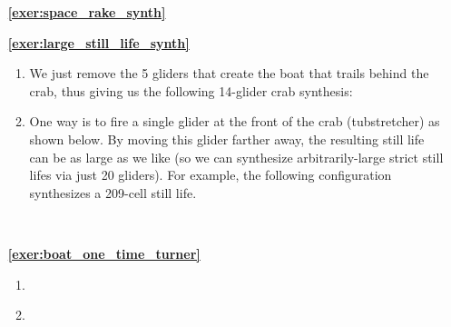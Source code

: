 \begin{multicols}{2}
\begin{itemize}[leftmargin=0em]
\begin{enumerate}[leftmargin=1.5em,label=\bf\color{ocre}(\alph*)]
			\item {} \\
		\end{enumerate}
		
		
		\item[\bf\color{ocre}\sffamily\ref{exer:space_rake_synth}]  \\
		
		
		\item[\bf\color{ocre}\sffamily\ref{exer:large_still_life_synth}]
		\begin{enumerate}[leftmargin=1.5em,label=\bf\color{ocre}(\alph*),series=solu_one_time]
			\item We just remove the 5 gliders that create the boat that trails behind the crab, thus giving us the following 14-glider crab synthesis:
			\begin{center}
			\end{center}
			
			\item One way is to fire a single glider at the front of the crab (tubstretcher) as shown below. By moving this glider farther away, the resulting still life can be as large as we like (so we can synthesize arbitrarily-large strict still lifes via just 20 gliders). For example, the following configuration synthesizes a 209-cell still life.
			\begin{center}
				 \\
			\end{center}
		\end{enumerate}
		
		
		\item[\bf\color{ocre}\sffamily\ref{exer:boat_one_time_turner}]
		\begin{enumerate}[leftmargin=1.5em,label=\bf\color{ocre}(\alph*),series=solu_one_time]
			\item {}
			
			\item {} \\
			

\end{enumerate}
\end{itemize}
\end{multicols}
